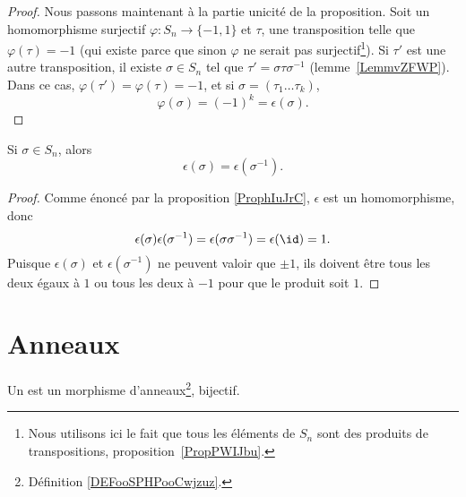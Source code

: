 \begin{proof}
    Nous passons maintenant à la partie unicité de la proposition. Soit un homomorphisme surjectif \( \varphi\colon S_n\to \{ -1,1 \}\) et \( \tau\), une transposition telle que \( \varphi(\tau)=-1\) (qui existe parce que sinon \( \varphi\) ne serait pas surjectif\footnote{Nous utilisons ici le fait que tous les éléments de \( S_n\) sont des produits de transpositions, proposition~\ref{PropPWIJbu}.}). Si \( \tau'\) est une autre transposition, il existe \( \sigma\in S_n\) tel que \( \tau'=\sigma\tau\sigma^{-1}\) (lemme~\ref{LemmvZFWP}). Dans ce cas, \( \varphi(\tau')=\varphi(\tau)=-1\), et si \( \sigma=(\tau_1\ldots \tau_k) \),
    \begin{equation}
         \varphi(\sigma)=(-1)^k=\epsilon(\sigma).
    \end{equation}
\end{proof}

\begin{corollary}       \label{CORooZLUKooBOhUPG}
    Si \( \sigma\in S_n\), alors
    \begin{equation}
        \epsilon(\sigma)=\epsilon(\sigma^{-1}).
    \end{equation}
\end{corollary}

\begin{proof}
    Comme énoncé par la proposition \ref{ProphIuJrC}, \( \epsilon\) est un homomorphisme, donc
    \begin{equation}
        \epsilon(\sigma)\epsilon(\sigma^{-1})=\epsilon(\sigma\sigma^{-1})=\epsilon(\id)=1.
    \end{equation}
    Puisque \( \epsilon(\sigma)\) et \( \epsilon(\sigma^{-1})\) ne peuvent valoir que \( \pm1\), ils doivent être tous les deux égaux à \( 1\) ou tous les deux à \( -1\) pour que le produit soit \( 1\).
\end{proof}

\section{Anneaux}

\begin{definition}      \label{DEFooKWKGooIOwGTA}
    Un  est un morphisme d'anneaux\footnote{Définition \ref{DEFooSPHPooCwjzuz}.}, bijectif.
\end{definition}

